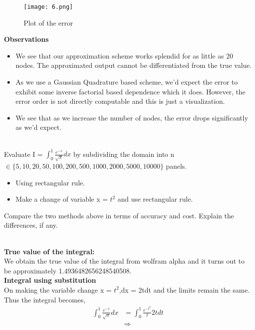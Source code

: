 \documentclass[letterpaper]{exam}
\begin{document}
\begin{questions}
\begin{solution}
\begin{figure}[H]  
     \centering
    \texttt{[image: 6.png]}
     \label{fig:Dendrogram for the problem 3(c)}
     \caption{Plot of the error}
\end{figure}
\textbf{Observations}
\begin{itemize}
    \item We see that our approximation scheme works splendid for as little as 20 nodes. The approximated output cannot be differentiated from the true value.
    \item As we use a Gaussian Quadrature based scheme, we'd expect the error to exhibit some inverse factorial based dependence which it does. However, the error order is not directly computable and this is just a visualization.
    \item We see that as we increase the number of nodes, the error drops significantly as we'd expect.
\end{itemize}
\end{solution}
\\
Evaluate I = $\int_{0}^{1} \frac{e^{-x}}{\sqrt{x}} dx$ by subdividing the domain into n $\in \{5,10,20,50,100,200,500,1000,2000,5000,10000\}$ panels.
\begin{itemize}
    \item Using rectangular rule.
    \item Make a change of variable x = $t^2$ and use rectangular rule.
\end{itemize}
Compare the two methods above in terms of accuracy and cost. Explain the differences, if any.
\begin{solution}
\\
\textbf{True value of the integral:}\\
We obtain the true value of the integral from wolfram alpha and it turns out to be approximately 1.4936482656248540508.\\
\textbf{Integral using substitution}\\
On making the variable change x = $t^2$,dx = 2tdt and the limits remain the same.\\
Thus the integral becomes,
\begin{align*}
    \int_{0}^{1} \frac{e^{-x}}{\sqrt{x}} dx &= \int_{0}^{1} \frac{e^{-t^2}}{t} 2t dt \\
    &\Rightarrow

\end{align*}
\end{solution}
\end{questions}
\end{document}
